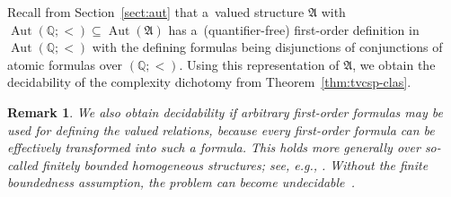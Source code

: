 \documentclass[preprint,12pt]{elsarticle}
\newcommand{\Q}{\mathbb Q}
\newcommand{\bA}{{\mathfrak A}}
\DeclareMathOperator{\Cyc}{Cycl}
\DeclareMathOperator{\Aut}{Aut}
\DeclareMathOperator{\fPol}{fPol}
\DeclareMathOperator{\VCSP}{VCSP}
\DeclareMathOperator{\CSP}{CSP}
\DeclareMathOperator{\Pol}{Pol}
\DeclareMathOperator{\Feas}{Feas}
\DeclareMathOperator{\Sym}{Sym}
\DeclareMathOperator{\mi}{mi}
\DeclareMathOperator{\lele}{ll}
\DeclareMathOperator{\mx}{mx}
\DeclareMathOperator{\lex}{lex}
\DeclareMathOperator{\const}{const}
\DeclareMathOperator{\Betw}{Betw}
\DeclareMathOperator{\Sep}{Sep}
\DeclareMathOperator{\Dis}{Dis}
\newtheorem{remark}[theorem]{Remark}
\begin{document}



Recall from Section~\ref{sect:aut} that a~valued structure $\bA$ with $\Aut(\Q; <) \subseteq \Aut(\bA)$ has a~(quantifier-free) first-order definition in $\Aut(\Q; <)$ with the defining formulas being disjunctions of conjunctions of atomic formulas over $(\Q;<)$.
Using this representation of $\bA$, we obtain the decidability of the complexity dichotomy from Theorem~\ref{thm:tvcsp-clas}. 

\begin{remark}
    We also obtain decidability if arbitrary first-order formulas may be used for defining the valued relations, because every first-order formula can be effectively transformed into such a formula. This holds more generally over so-called  \emph{finitely bounded homogeneous} structures; see, e.g., \cite[Proposition 7]{RydvalThesis}. Without the finite boundedness assumption, the problem can become undecidable~\cite{BPT-decidability-of-definability}. 
\end{remark}
 
\end{document}
